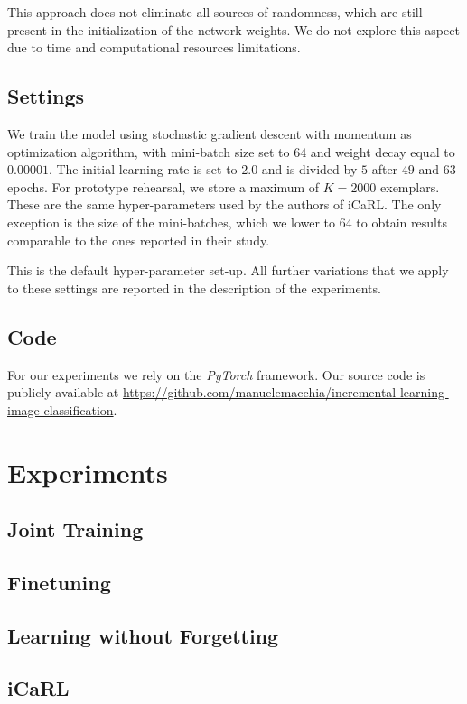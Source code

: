 \documentclass[10pt,twocolumn,letterpaper]{article}
\begin{document}
This approach does not eliminate all sources of randomness, which are still present in the initialization of the network weights. We do not explore this aspect due to time and computational resources limitations.

\subsection{Settings}
We train the model using stochastic gradient descent with momentum as optimization algorithm, with mini-batch size set to $64$ and weight decay equal to $0.00001$. The initial learning rate is set to $2.0$ and is divided by $5$ after $49$ and $63$ epochs. For prototype rehearsal, we store a maximum of $K=2000$ exemplars. These are the same hyper-parameters used by the authors of iCaRL. The only exception is the size of the mini-batches, which we lower to $64$ to obtain results comparable to the ones reported in their study.

This is the default hyper-parameter set-up. All further variations that we apply to these settings are reported in the description of the experiments.

\subsection{Code}
For our experiments we rely on the \emph{PyTorch} framework. Our source code is publicly available at
\url{https://github.com/manuelemacchia/incremental-learning-image-classification}.

\section{Experiments}
\subsection{Joint Training}

\subsection{Finetuning}

\subsection{Learning without Forgetting}

\subsection{iCaRL}

{\small


}
\end{document}
